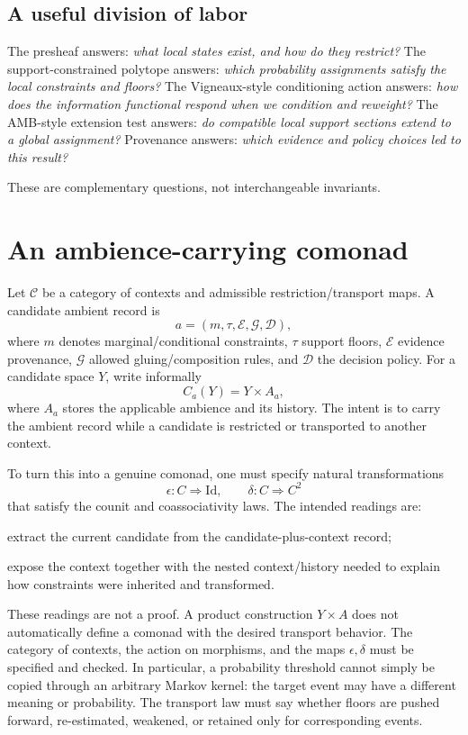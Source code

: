\documentclass[11pt]{article}
\newcommand{\Ctx}{\mathcal{C}}
\begin{document}
\subsection{A useful division of labor}

The presheaf answers: \emph{what local states exist, and how do they restrict?} The support-constrained polytope answers: \emph{which probability assignments satisfy the local constraints and floors?} The Vigneaux-style conditioning action answers: \emph{how does the information functional respond when we condition and reweight?} The AMB-style extension test answers: \emph{do compatible local support sections extend to a global assignment?} Provenance answers: \emph{which evidence and policy choices led to this result?}

These are complementary questions, not interchangeable invariants.

\section{An ambience-carrying comonad}

Let $\Ctx$ be a category of contexts and admissible restriction/transport maps. A candidate ambient record is
\[
 a=(m,\tau,\mathcal E,\mathcal G,\mathcal D),
\]
where $m$ denotes marginal/conditional constraints, $\tau$ support floors, $\mathcal E$ evidence provenance, $\mathcal G$ allowed gluing/composition rules, and $\mathcal D$ the decision policy. For a candidate space $Y$, write informally
\[
 C_a(Y)=Y\times A_a,
\]
where $A_a$ stores the applicable ambience and its history. The intent is to carry the ambient record while a candidate is restricted or transported to another context.

To turn this into a genuine comonad, one must specify natural transformations
\[
 \epsilon:C\Rightarrow\mathrm{Id},\qquad
 \delta:C\Rightarrow C^2
\]
that satisfy the counit and coassociativity laws. The intended readings are:
\begin{description}[leftmargin=2em,style=nextline]
  \item[Counit] extract the current candidate from the candidate-plus-context record;
  \item[Comultiplication] expose the context together with the nested context/history needed to explain how constraints were inherited and transformed.
\end{description}

These readings are not a proof. A product construction $Y\times A$ does not automatically define a comonad with the desired transport behavior. The category of contexts, the action on morphisms, and the maps $\epsilon,\delta$ must be specified and checked. In particular, a probability threshold cannot simply be copied through an arbitrary Markov kernel: the target event may have a different meaning or probability. The transport law must say whether floors are pushed forward, re-estimated, weakened, or retained only for corresponding events.
\end{document}
